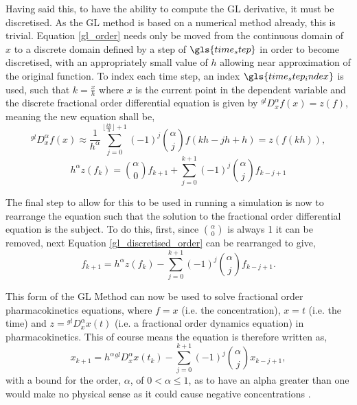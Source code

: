 Having said this, to have the ability to compute the GL derivative, it must be discretised. As the GL method is based on a numerical method already, this is trivial. Equation \ref{gl_order} needs only be moved from the continuous domain of $x$ to a discrete domain defined by a step of $\gls{time_step}$ in order to become discretised, with an appropriately small value of $h$ allowing near approximation of the original function. To index each time step, an index $\gls{time_step_index}$ is used, such that $k=\frac{x}{h}$ where $x$ is the current point in the dependent variable and the discrete fractional order differential equation is given by $^{gl}D^{\alpha}_{x}f(x) = z(f)$, meaning the new equation shall be, 
\begin{equation}\label{gl_semi_ddiscretised_order}
	^{gl}D^{\alpha}_{x}f(x) \approx \frac{1}{h^{\alpha}}\sum_{j=0}^{\lfloor\frac{kh}{h}\rfloor+1} (-1)^{j} {\alpha \choose j} f(kh - jh + h) = z(f(kh)),
\end{equation}
\begin{equation}\label{gl_discretised_order}
	 h^{\alpha}z(f_{k}) = {\alpha \choose 0} f_{k+1} + \sum_{j=0}^{k+1} (-1)^{j} {\alpha \choose j} f_{k - j + 1}
\end{equation}

The final step to allow for this to be used in running a simulation is now to rearrange the equation such that the solution to the fractional order differential equation is the subject. To do this, first, since ${\alpha \choose 0}$ is always 1 it can be removed, next Equation \ref{gl_discretised_order} can be rearranged to give,
\begin{equation}\label{gl_solution}
	f_{k+1} = h^{\alpha}z(f_{k}) - \sum_{j=0}^{k+1} (-1)^{j} {\alpha \choose j} f_{k - j + 1}.
\end{equation}

This form of the GL Method can now be used to solve fractional order pharmacokinetics equations, where $f = x$ (i.e. the concentration), $x = t$ (i.e. the time) and $z = \phantom{}^{gl}D^{\alpha}_{x}x(t)$ (i.e. a fractional order dynamics equation) in pharmacokinetics. This of course means the equation is therefore written as,
\begin{equation}\label{gl_pk_solution}
	x_{k+1} = h^{\alpha}\phantom{ }^{gl}D^{\alpha}_{x}x(t_k) - \sum_{j=0}^{k+1} (-1)^{j} {\alpha \choose j} x_{k - j + 1},
\end{equation}
with a bound for the order, $\alpha$, of $0 < \alpha \leq 1$, as to have an alpha greater than one would make no physical sense as it could cause negative concentrations \cite{Fractional_calculus_in_pharmacokinetics}.


